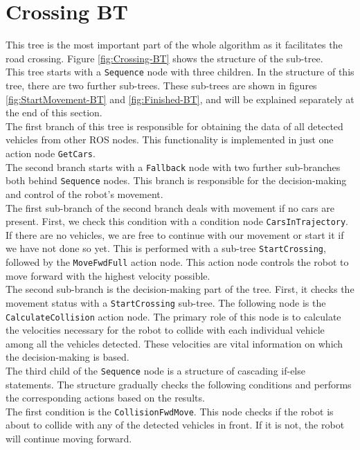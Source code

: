 \section{Crossing BT}
\label{sec:Crossing-BT}
    This tree is the most important part of the whole algorithm as it facilitates the road crossing. Figure \ref{fig:Crossing-BT} shows the structure of the sub-tree.\\
    This tree starts with a \texttt{Sequence} node with three children. In the structure of this tree, there are two further sub-trees. These sub-trees are shown in figures \ref{fig:StartMovement-BT} and \ref{fig:Finished-BT}, and will be explained separately at the end of this section.\\
    The first branch of this tree is responsible for obtaining the data of all detected vehicles from other ROS nodes. This functionality is implemented in just one action node \texttt{GetCars}.\\
    The second branch starts with a \texttt{Fallback} node with two further sub-branches both behind \texttt{Sequence} nodes. This branch is responsible for the decision-making and control of the robot's movement.\\
    The first sub-branch of the second branch deals with movement if no cars are present. First, we check this condition with a condition node \texttt{CarsInTrajectory}. If there are no vehicles, we are free to continue with our movement or start it if we have not done so yet. This is performed with a sub-tree \texttt{StartCrossing}, followed by the \texttt{MoveFwdFull} action node. This action node controls the robot to move forward with the highest velocity possible.\\
    The second sub-branch is the decision-making part of the tree. First, it checks the movement status with a \texttt{StartCrossing} sub-tree. The following node is the \texttt{CalculateCollision} action node. The primary role of this node is to calculate the velocities necessary for the robot to collide with each individual vehicle among all the vehicles detected. These velocities are vital information on which the decision-making is based.\\
    The third child of the \texttt{Sequence} node is a structure of cascading if-else statements. The structure gradually checks the following conditions and performs the corresponding actions based on the results.\\
    The first condition is the \texttt{CollisionFwdMove}. This node checks if the robot is about to collide with any of the detected vehicles in front. If it is not, the robot will continue moving forward.\\
